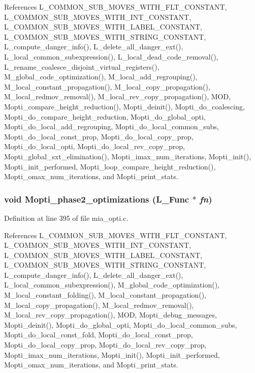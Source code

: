 References L\_\-COMMON\_\-SUB\_\-MOVES\_\-WITH\_\-FLT\_\-CONSTANT, L\_\-COMMON\_\-SUB\_\-MOVES\_\-WITH\_\-INT\_\-CONSTANT, L\_\-COMMON\_\-SUB\_\-MOVES\_\-WITH\_\-LABEL\_\-CONSTANT, L\_\-COMMON\_\-SUB\_\-MOVES\_\-WITH\_\-STRING\_\-CONSTANT, L\_\-compute\_\-danger\_\-info(), L\_\-delete\_\-all\_\-danger\_\-ext(), L\_\-local\_\-common\_\-subexpression(), L\_\-local\_\-dead\_\-code\_\-removal(), L\_\-rename\_\-coalesce\_\-disjoint\_\-virtual\_\-registers(), M\_\-global\_\-code\_\-optimization(), M\_\-local\_\-add\_\-regrouping(), M\_\-local\_\-constant\_\-propagation(), M\_\-local\_\-copy\_\-propagation(), M\_\-local\_\-redmov\_\-removal(), M\_\-local\_\-rev\_\-copy\_\-propagation(), MOD, Mopti\_\-compare\_\-height\_\-reduction(), Mopti\_\-deinit(), Mopti\_\-do\_\-coalescing, Mopti\_\-do\_\-compare\_\-height\_\-reduction, Mopti\_\-do\_\-global\_\-opti, Mopti\_\-do\_\-local\_\-add\_\-regrouping, Mopti\_\-do\_\-local\_\-common\_\-subs, Mopti\_\-do\_\-local\_\-const\_\-prop, Mopti\_\-do\_\-local\_\-copy\_\-prop, Mopti\_\-do\_\-local\_\-opti, Mopti\_\-do\_\-local\_\-rev\_\-copy\_\-prop, Mopti\_\-global\_\-sxt\_\-elimination(), Mopti\_\-imax\_\-num\_\-iterations, Mopti\_\-init(), Mopti\_\-init\_\-performed, Mopti\_\-loop\_\-compare\_\-height\_\-reduction(), Mopti\_\-omax\_\-num\_\-iterations, and Mopti\_\-print\_\-stats.
\subsubsection{\setlength{\rightskip}{0pt plus 5cm}void Mopti\_\-phase2\_\-optimizations (L\_\-Func $\ast$ {\em fn})}\label{mia__opti_8h_858bb385579a19e2bd869f96a17e52ee}




Definition at line 395 of file mia\_\-opti.c.

References L\_\-COMMON\_\-SUB\_\-MOVES\_\-WITH\_\-FLT\_\-CONSTANT, L\_\-COMMON\_\-SUB\_\-MOVES\_\-WITH\_\-INT\_\-CONSTANT, L\_\-COMMON\_\-SUB\_\-MOVES\_\-WITH\_\-LABEL\_\-CONSTANT, L\_\-COMMON\_\-SUB\_\-MOVES\_\-WITH\_\-STRING\_\-CONSTANT, L\_\-compute\_\-danger\_\-info(), L\_\-delete\_\-all\_\-danger\_\-ext(), L\_\-local\_\-common\_\-subexpression(), M\_\-global\_\-code\_\-optimization(), M\_\-local\_\-constant\_\-folding(), M\_\-local\_\-constant\_\-propagation(), M\_\-local\_\-copy\_\-propagation(), M\_\-local\_\-redmov\_\-removal(), M\_\-local\_\-rev\_\-copy\_\-propagation(), MOD, Mopti\_\-debug\_\-messages, Mopti\_\-deinit(), Mopti\_\-do\_\-global\_\-opti, Mopti\_\-do\_\-local\_\-common\_\-subs, Mopti\_\-do\_\-local\_\-const\_\-fold, Mopti\_\-do\_\-local\_\-const\_\-prop, Mopti\_\-do\_\-local\_\-copy\_\-prop, Mopti\_\-do\_\-local\_\-rev\_\-copy\_\-prop, Mopti\_\-imax\_\-num\_\-iterations, Mopti\_\-init(), Mopti\_\-init\_\-performed, Mopti\_\-omax\_\-num\_\-iterations, and Mopti\_\-print\_\-stats.
